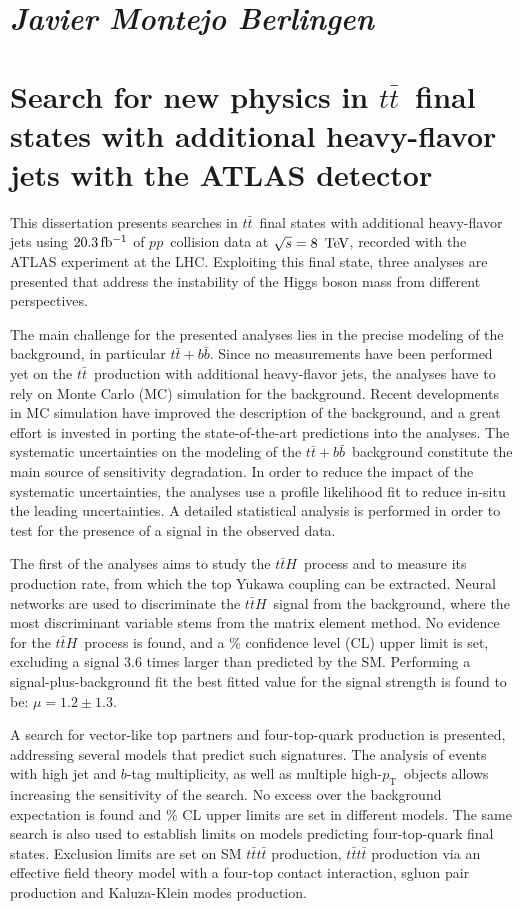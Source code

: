 \documentclass{article}
\newcommand\fourtop{{\ensuremath{t\bar{t}t\bar{t}}}}
\def\ttH{\ensuremath{t\bar{t}H}}
\def\ttbar{\ensuremath{t\bar{t}}}
\def\ttbb{\ensuremath{t\bar{t}+b\bar{b}}}
\def\pt{\ensuremath{p_{\mathrm{T}}}} %
\def\tev{\ifmmode {\mathrm{\ Te\kern -0.1em V}}\else
                   \textrm{Te\kern -0.1em V}\fi}%
\def\pp{\ensuremath{pp}}
\begin{document}
\section*{\textit{Javier Montejo Berlingen}}
\section*{Search for new physics in \ttbar\ final states with additional heavy-flavor jets with the ATLAS detector}

This dissertation presents searches in \ttbar\ final states with additional heavy-flavor jets using $\unit[20.3]{fb^{-1}}$ of \pp\ collision data at 
$\sqrt{s} = \unit[8]{\tev}$, recorded with the ATLAS experiment at the LHC. 
Exploiting this final state, three analyses are presented that address the
instability of the Higgs boson mass from different perspectives.

The main challenge for the presented analyses lies in the precise modeling of the background, in particular \ttbb. Since no measurements have been performed yet on the \ttbar\ production with additional heavy-flavor jets, the analyses have to rely on Monte Carlo (MC) simulation for the background. Recent developments in MC simulation have improved the description of the background, and a great effort is invested in porting the state-of-the-art predictions into the analyses. The systematic uncertainties on the modeling of the \ttbb\ background constitute the main source of sensitivity degradation.
In order to reduce the impact of the systematic uncertainties, the analyses use a profile likelihood fit to reduce in-situ the leading uncertainties. A detailed statistical analysis is performed in order to test for the presence of a signal in the observed data.

The first of the analyses aims to study the \ttH\ process and to measure its production rate, from which the top Yukawa coupling can be extracted. Neural networks are used to discriminate the \ttH\ signal from the background, where the most discriminant variable stems from the matrix element method.
No evidence for the \ttH\ process is found, and a \unit[95]{\%} confidence level (CL) upper limit is set, excluding a signal 3.6 times larger than predicted by the SM. Performing a signal-plus-background fit the best fitted value for the signal strength is found to be: $\mu= 1.2 \pm 1.3$. 

A search for vector-like top partners and four-top-quark production is presented, addressing several models that predict such signatures. The analysis of events with high jet and $b$-tag multiplicity, as well as multiple high-\pt\ objects allows increasing the sensitivity of the search. No excess over the background expectation is found and \unit[95]{\%} CL upper limits are set in different models. 
The same search is also used to establish limits on models predicting four-top-quark final states. Exclusion limits are set on SM $\fourtop$ production, $\fourtop$ production via an effective field theory model with a four-top contact interaction, sgluon pair production and Kaluza-Klein modes production. 
\end{document}
